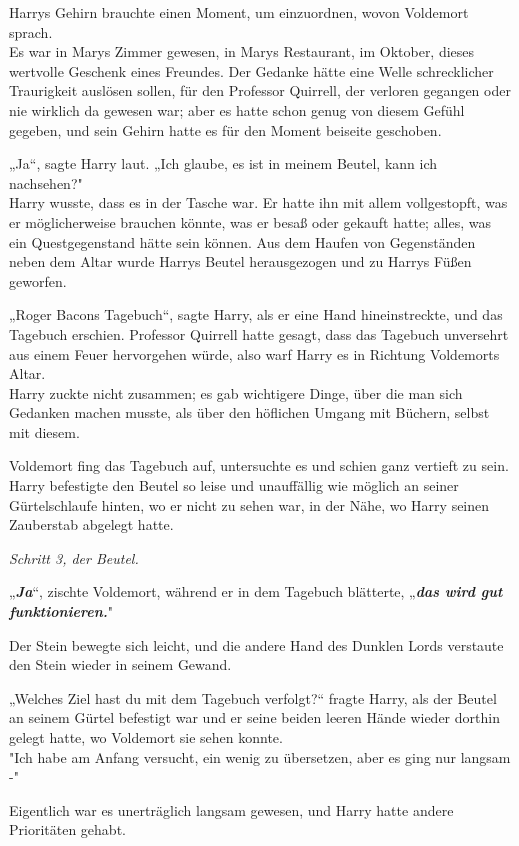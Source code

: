 {Harrys Gehirn brauchte einen Moment, um einzuordnen, wovon Voldemort sprach.\\ Es war in Marys Zimmer gewesen, in Marys Restaurant, im Oktober, dieses wertvolle Geschenk eines Freundes. Der Gedanke hätte eine Welle schrecklicher Traurigkeit auslösen sollen, für den Professor Quirrell, der verloren gegangen oder nie wirklich da gewesen war; aber es hatte schon genug von diesem Gefühl gegeben, und sein Gehirn hatte es für den Moment beiseite geschoben.

„Ja“, sagte Harry laut. „Ich glaube, es ist in meinem Beutel, kann ich nachsehen?"\\ Harry wusste, dass es in der Tasche war. Er hatte ihn mit allem vollgestopft, was er möglicherweise brauchen könnte, was er besaß oder gekauft hatte; alles, was ein Questgegenstand hätte sein können. Aus dem Haufen von Gegenständen neben dem Altar wurde Harrys Beutel herausgezogen und zu Harrys Füßen geworfen.

„Roger Bacons Tagebuch“, sagte Harry, als er eine Hand hineinstreckte, und das Tagebuch erschien. Professor Quirrell hatte gesagt, dass das Tagebuch unversehrt aus einem Feuer hervorgehen würde, also warf Harry es in Richtung Voldemorts Altar.\\ Harry zuckte nicht zusammen; es gab wichtigere Dinge, über die man sich Gedanken machen musste, als über den höflichen Umgang mit Büchern, selbst mit diesem.

Voldemort fing das Tagebuch auf, untersuchte es und schien ganz vertieft zu sein. Harry befestigte den Beutel so leise und unauffällig wie möglich an seiner Gürtelschlaufe hinten, wo er nicht zu sehen war, in der Nähe, wo Harry seinen Zauberstab abgelegt hatte.

\emph{Schritt 3, der Beutel.}

„\textbf{\emph{Ja}}“, zischte Voldemort, während er in dem Tagebuch blätterte, „\textbf{\emph{das wird gut funktionieren.}}"

Der Stein bewegte sich leicht, und die andere Hand des Dunklen Lords verstaute den Stein wieder in seinem Gewand.

„Welches Ziel hast du mit dem Tagebuch verfolgt?“ fragte Harry, als der Beutel an seinem Gürtel befestigt war und er seine beiden leeren Hände wieder dorthin gelegt hatte, wo Voldemort sie sehen konnte.\\ "Ich habe am Anfang versucht, ein wenig zu übersetzen, aber es ging nur langsam -"

Eigentlich war es unerträglich langsam gewesen, und Harry hatte andere Prioritäten gehabt.

}
